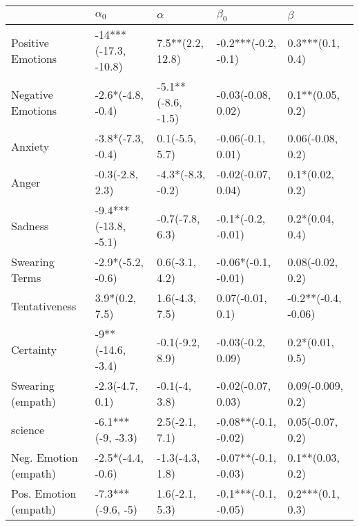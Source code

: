 \begin{tabular}{lllll}
\toprule
{} &            $\alpha_0$ &            $\alpha$ &             $\beta_0$ &              $\beta$ \\
\midrule
Positive Emotions     &  -14***(-17.3, -10.8) &    7.5**(2.2, 12.8) &   -0.2***(-0.2, -0.1) &     0.3***(0.1, 0.4) \\
Negative Emotions     &     -2.6*(-4.8, -0.4) &  -5.1**(-8.6, -1.5) &    -0.03(-0.08, 0.02) &     0.1**(0.05, 0.2) \\
Anxiety               &     -3.8*(-7.3, -0.4) &      0.1(-5.5, 5.7) &     -0.06(-0.1, 0.01) &     0.06(-0.08, 0.2) \\
Anger                 &       -0.3(-2.8, 2.3) &   -4.3*(-8.3, -0.2) &    -0.02(-0.07, 0.04) &      0.1*(0.02, 0.2) \\
Sadness               &  -9.4***(-13.8, -5.1) &     -0.7(-7.8, 6.3) &    -0.1*(-0.2, -0.01) &      0.2*(0.04, 0.4) \\
Swearing Terms        &     -2.9*(-5.2, -0.6) &      0.6(-3.1, 4.2) &   -0.06*(-0.1, -0.01) &     0.08(-0.02, 0.2) \\
Tentativeness         &        3.9*(0.2, 7.5) &      1.6(-4.3, 7.5) &      0.07(-0.01, 0.1) &  -0.2**(-0.4, -0.06) \\
Certainty             &     -9**(-14.6, -3.4) &     -0.1(-9.2, 8.9) &     -0.03(-0.2, 0.09) &      0.2*(0.01, 0.5) \\
Swearing (empath)     &       -2.3(-4.7, 0.1) &       -0.1(-4, 3.8) &    -0.02(-0.07, 0.03) &    0.09(-0.009, 0.2) \\
science               &     -6.1***(-9, -3.3) &      2.5(-2.1, 7.1) &  -0.08**(-0.1, -0.02) &     0.05(-0.07, 0.2) \\
Neg. Emotion (empath) &     -2.5*(-4.4, -0.6) &     -1.3(-4.3, 1.8) &  -0.07**(-0.1, -0.03) &     0.1**(0.03, 0.2) \\
Pos. Emotion (empath) &     -7.3***(-9.6, -5) &      1.6(-2.1, 5.3) &  -0.1***(-0.1, -0.05) &     0.2***(0.1, 0.3) \\
\bottomrule
\end{tabular}
